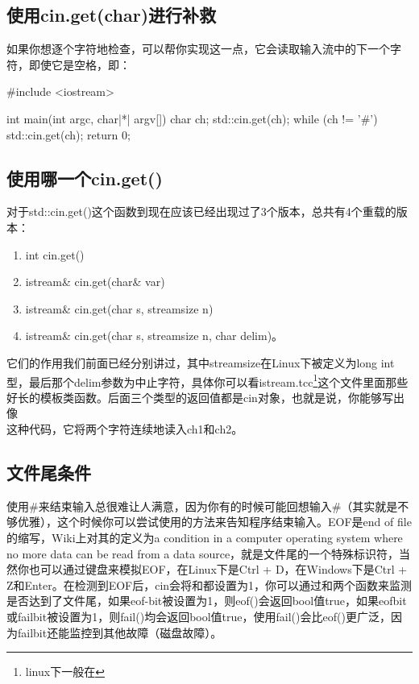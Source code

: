 \subsection{使用cin.get(char)进行补救}

如果你想逐个字符地检查，可以帮你实现这一点，它会读取输入流中的下一个字符，即使它是空格，即：

\begin{cpp}
#include <iostream>

int main(int argc, char|*| argv[]) {
    char ch;
    std::cin.get(ch);
    while (ch != '#') {
        std::cin.get(ch);
    }
    return 0;
}
\end{cpp}

\subsection{使用哪一个cin.get()}

对于std::cin.get()这个函数到现在应该已经出现过了3个版本，总共有4个重载的版本：

\begin{enumerate}
\item int cin.get()
\item istream\& cin.get(char\& var)
\item istream\& cin.get(char\fira{*} s, streamsize n)
\item istream\& cin.get(char\fira{*} s, streamsize n, char delim)。
\end{enumerate}

它们的作用我们前面已经分别讲过，其中streamsize在Linux下被定义为long int型，最后那个delim参数为中止字符，具体你可以看istream.tcc\footnote{linux下一般在}这个文件里面那些好长的模板类函数。后面三个类型的返回值都是cin对象，也就是说，你能够写出像\\ 这种代码，它将两个字符连续地读入ch1和ch2。

\subsection{文件尾条件}

使用\#来结束输入总很难让人满意，因为你有的时候可能回想输入\#（其实就是不够优雅），这个时候你可以尝试使用的方法来告知程序结束输入。EOF是end of f\/ile的缩写，Wiki上对其的定义为a condition in a computer operating system where no more data can be read from a data source，就是文件尾的一个特殊标识符，当然你也可以通过键盘来模拟EOF，在Linux下是Ctrl + D，在Windows下是Ctrl + Z和Enter。在检测到EOF后，cin会将和都设置为1，你可以通过和两个函数来监测是否达到了文件尾，如果eof-bit被设置为1，则eof()会返回bool值true，如果eof\/bit或failbit被设置为1，则fail()均会返回bool值true，使用fail()会比eof()更广泛，因为failbit还能监控到其他故障（磁盘故障）。

